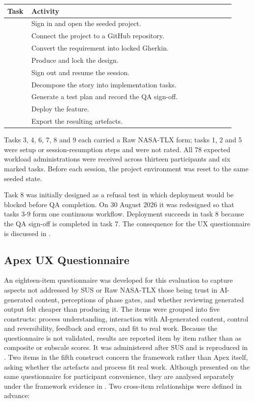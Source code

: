 \begin{table}[htb]
\centering
\small
\renewcommand{\arraystretch}{1.15}
\begin{tabular}{>{\raggedright\arraybackslash}p{0.08\linewidth}
                >{\raggedright\arraybackslash}p{0.84\linewidth}}
\toprule
\textbf{Task} & \textbf{Activity} \\
\midrule
1 & Sign in and open the seeded project. \\
2 & Connect the project to a GitHub repository. \\
3 & Convert the requirement into locked Gherkin. \\
4 & Produce and lock the design. \\
5 & Sign out and resume the session. \\
6 & Decompose the story into implementation tasks. \\
7 & Generate a test plan and record the \ac{QA} sign-off. \\
8 & Deploy the feature. \\
9 & Export the resulting artefacts. \\
\bottomrule
\end{tabular}
\end{table}

Tasks 3, 4, 6, 7, 8 and 9 each carried a Raw \ac{NASA-TLX} form; tasks 1, 2 and 5 were setup or session-resumption steps and were not rated. All 78 expected workload administrations were received across thirteen participants and six marked tasks. Before each session, the project environment was reset to the same seeded state.

Task 8 was initially designed as a refusal test in which deployment would be blocked before \ac{QA} completion. On 30 August 2026 it was redesigned so that tasks 3-9 form one continuous workflow. Deployment succeeds in task 8 because the \ac{QA} sign-off is completed in task 7. The consequence for the \ac{UX} questionnaire is discussed in .

\subsection{Apex UX Questionnaire}
\label{sec:apex_ux}

An eighteen-item questionnaire was developed for this evaluation to capture aspects not addressed by \ac{SUS} or Raw \ac{NASA-TLX} those being trust in AI-generated content, perceptions of phase gates, and whether reviewing generated output felt cheaper than producing it. The items were grouped into five constructs: process understanding, interaction with AI-generated content, control and reversibility, feedback and errors, and fit to real work. Because the questionnaire is not validated, results are reported item by item rather than as composite or subscale scores. It was administered after \ac{SUS} and is reproduced in . Two items in the fifth construct concern the framework rather than Apex itself, asking whether the artefacts and process fit real work. Although presented on the same questionnaire for participant convenience, they are analysed separately under the framework evidence in . Two cross-item relationships were defined in advance:

